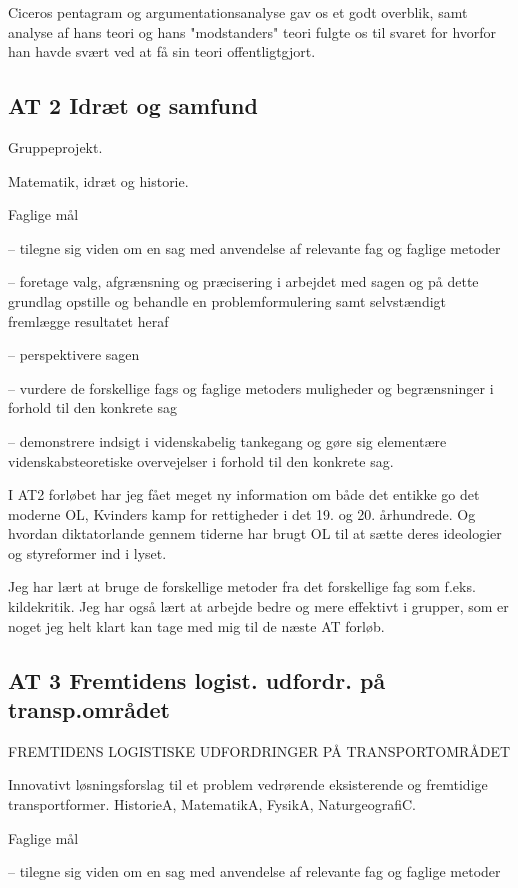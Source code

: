 \documentclass{article}
\begin{document}
Ciceros pentagram og argumentationsanalyse gav os et godt overblik, samt analyse af hans teori og hans "modstanders" teori fulgte os til svaret for hvorfor han havde svært ved at få sin teori offentligtgjort.

\subsection{AT 2 Idræt og samfund}

Gruppeprojekt.

Matematik, idræt og historie.

Faglige mål 

– tilegne sig viden om en sag med anvendelse af relevante fag og faglige metoder

– foretage valg, afgrænsning og præcisering i arbejdet med sagen og på dette grundlag opstille og behandle en problemformulering samt selvstændigt fremlægge resultatet heraf

– perspektivere sagen

– vurdere de forskellige fags og faglige metoders muligheder og begrænsninger i forhold til den konkrete sag

– demonstrere indsigt i videnskabelig tankegang og gøre sig elementære videnskabsteoretiske overvejelser i forhold til den konkrete sag.

I AT2 forløbet har jeg fået meget ny information om både det entikke go det moderne OL, Kvinders kamp for rettigheder i det 19. og 20. århundrede. Og hvordan diktatorlande gennem tiderne har brugt OL til at sætte deres ideologier og styreformer ind i lyset.

Jeg har lært at bruge de forskellige metoder fra det forskellige fag som f.eks. kildekritik. Jeg har også lært at arbejde bedre og mere effektivt i grupper, som er noget jeg helt klart kan tage med mig til de næste AT forløb.

\subsection{AT 3 Fremtidens logist. udfordr. på transp.området}

FREMTIDENS LOGISTISKE UDFORDRINGER PÅ TRANSPORTOMRÅDET

Innovativt løsningsforslag til et problem vedrørende eksisterende og fremtidige transportformer.
HistorieA, MatematikA, FysikA, NaturgeografiC.

Faglige mål

– tilegne sig viden om en sag med anvendelse af relevante fag og faglige metoder
\end{document}
